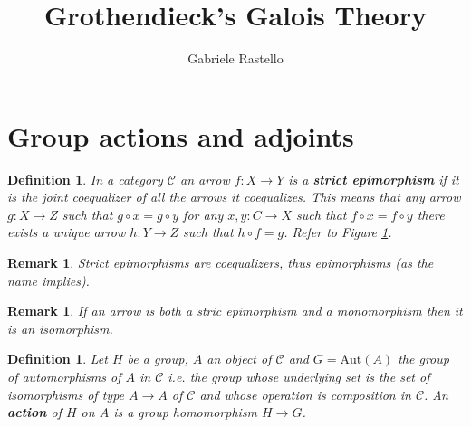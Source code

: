 \documentclass[italian, 12pt, reqno]{article}
\theoremstyle{myteo}
\newtheorem{definition}[theorem]{Definition}
\newtheorem{remark}[theorem]{Remark}
\numberwithin{equation}{section}
\newcommand{\cat}[1]{\mathscr{#1}}
\newcommand{\aut}{\text{Aut}}
\newcommand{\fun}[3]{#1\colon#2\to #3}
\begin{document}
\title{Grothendieck's Galois Theory}
\author{Gabriele Rastello}
\maketitle

\section{Group actions and adjoints}
\label{sec:1}

\begin{definition}
  \label{def:strit_epi}
  In a category \(\cat{C}\) an arrow \(\fun{f}{X}{Y}\) is a \textbf{strict epimorphism} if it is the joint coequalizer of all the arrows it coequalizes.
  This means that any arrow \(\fun{g}{X}{Z}\) such that \(g\circ x = g\circ y\) for any \(\fun{x,y}{C}{X}\) such that \(f\circ x = f\circ y\) there exists a unique arrow \(\fun{h}{Y}{Z}\) such that \(h\circ f = g\).
  Refer to Figure \ref{diagram:strict_epi}.
\end{definition}

\begin{figure}[h]
  \begin{center}
  \end{center}
  \caption{}
  \label{diagram:strict_epi}
\end{figure}

\begin{remark}
  \label{rem:strict_epi}
  Strict epimorphisms are coequalizers, thus epimorphisms (as the name implies).
\end{remark}

\begin{remark}
  \label{rem:strict_epi_plus_mono}
  If an arrow is both a stric epimorphism and a monomorphism then it is an isomorphism.
\end{remark}

\begin{definition}
  \label{def:action}
  Let \(H\) be a group, \(A\) an object of \(\cat{C}\) and \(G = \aut(A)\) the group of automorphisms of \(A\) in \(\cat{C}\) i.e. the group whose underlying set is the set of isomorphisms of type \(A\to A\) of \(\cat{C}\) and whose operation is composition in \(\cat{C}\).
  An \textbf{action} of \(H\) on \(A\) is a group homomorphism \(H \to G\).
\end{definition}
\end{document}
